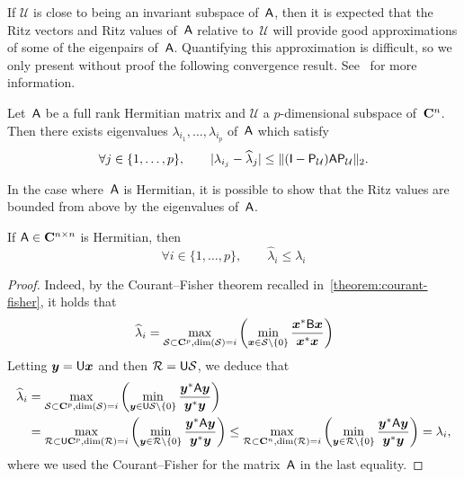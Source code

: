 If $\mathcal U$ is close to being an invariant subspace of~$\mathsf A$,
then it is expected that the Ritz vectors and Ritz values of~$\mathsf A$ relative to~$\mathcal U$ will provide good approximations of some of the eigenpairs of~$\mathsf A$.
Quantifying this approximation is difficult,
so we only present without proof the following convergence result.
See~\cite{MR1990645} for more information.
\begin{proposition}
    Let~$\mathsf A$ be a full rank Hermitian matrix and $\mathcal U$ a $p$-dimensional subspace of~$\mathbf C^n$.
    Then there exists eigenvalues $\lambda_{i_1}, \dotsc, \lambda_{i_p}$ of~$\mathsf A$ which satisfy
    \[
        \forall j \in \{1, \dotsc, p\}, \qquad
        \lvert\lambda_{i_j} - \widehat \lambda_j\rvert \leq \lVert(\mathsf I - \mathsf P_{\mathcal U}) \mathsf A \mathsf P_{\mathcal U}\rVert_2.
    \]
\end{proposition}

In the case where~$\mathsf A$ is Hermitian,
it is possible to show that the Ritz values are bounded from above by the eigenvalues of~$\mathsf A$.
\begin{proposition}
    If $\mathsf A \in \mathbf C^{n \times n}$ is Hermitian,
    then
    \[
        \forall i \in \{1, \dotsc, p\}, \qquad
        \widehat \lambda_i \leq \lambda_i
    \]
\end{proposition}
\begin{proof}
Indeed, by the Courant--Fisher theorem recalled in~\cref{theorem:courant-fisher},
it holds that
\[
    \widehat \lambda_i
    = \max_{\mathcal S \subset \mathbf C^p, {\rm dim}(\mathcal S) = i} \left( \min_{\mathbf{\boldsymbol{x}} \in \mathcal S \backslash\{0\}} \frac{\mathbf{\boldsymbol{x}}^* \mathsf B \mathbf{\boldsymbol{x}}}{\mathbf{\boldsymbol{x}}^* \mathbf{\boldsymbol{x}}} \right)
\]
Letting $\mathbf{\boldsymbol{y}} = \mathsf U \mathbf{\boldsymbol{x}}$ and then $\mathcal R = \mathsf U \mathcal S$,
we deduce that
\begin{align*}
    \widehat \lambda_i
    &= \max_{\mathcal S \subset \mathbf C^p, {\rm dim}(\mathcal S) = i} \left( \min_{\mathbf{\boldsymbol{y}} \in \mathsf U \mathcal S \backslash\{0\}} \frac{\mathbf{\boldsymbol{y}}^* \mathsf A \mathbf{\boldsymbol{y}}}{\mathbf{\boldsymbol{y}}^* \mathbf{\boldsymbol{y}}} \right) \\
    &= \max_{\mathcal R \subset \mathsf U \mathbf C^p, {\rm dim}(\mathcal R) = i} \left( \min_{\mathbf{\boldsymbol{y}} \in \mathcal R \backslash\{0\}} \frac{\mathbf{\boldsymbol{y}}^* \mathsf A \mathbf{\boldsymbol{y}}}{\mathbf{\boldsymbol{y}}^* \mathbf{\boldsymbol{y}}} \right)
    \leq \max_{\mathcal R \subset \mathbf C^n, {\rm dim}(\mathcal R) = i} \left( \min_{\mathbf{\boldsymbol{y}} \in \mathcal R \backslash\{0\}} \frac{\mathbf{\boldsymbol{y}}^* \mathsf A \mathbf{\boldsymbol{y}}}{\mathbf{\boldsymbol{y}}^* \mathbf{\boldsymbol{y}}} \right) = \lambda_i,
\end{align*}
where we used the Courant--Fisher for the matrix~$\mathsf A$ in the last equality.
\end{proof}

